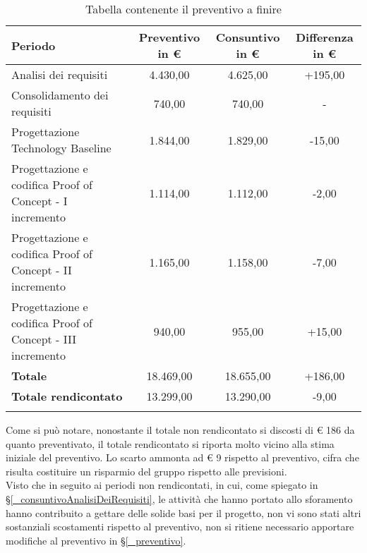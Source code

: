 \begin{longtable}{|p{6cm}|c|c|c|}
	\hline
	\rowcolor{lighter-grayer}
	\textbf{Periodo}             & \textbf{Preventivo in €} & \textbf{Consuntivo in €} & \textbf{Differenza in €} \\
	\hline
	\endfirsthead

	\hline
	Analisi dei requisiti            & 4.430,00        & 4.625,00  & +195,00   \\ 
	\hline
	\hline
	Consolidamento dei requisiti     & 740,00        & 740,00    & -  \\ 
	\hline
	\hline
	Progettazione Technology Baseline      & 1.844,00       & 1.829,00  & -15,00  \\
	\hline
	\hline
	Progettazione e codifica Proof of Concept - I incremento      & 1.114,00            & 1.112,00   & -2,00          \\
	\hline
	\hline
	Progettazione e codifica Proof of Concept - II incremento     & 1.165,00            & 1.158,00 & -7,00           \\
	\hline
	\hline
	Progettazione e codifica Proof of Concept - III incremento    & 940,00       & 955,00  & +15,00   \\
	\hline
	\textbf{Totale } & 18.469,00     & 18.655,00   &  +186,00       \\
	\hline
	\hline
	\textbf{Totale rendicontato} & 13.299,00       & 13.290,00     & -9,00     \\
	\hline
	\hline
	\rowcolor{white}
	\caption{Tabella contenente il preventivo a finire}
\end{longtable}

Come si può notare, nonostante il totale non rendicontato si discosti di € 186 da quanto preventivato, il totale rendicontato si riporta molto vicino alla stima iniziale del preventivo. Lo scarto ammonta ad € 9 rispetto al preventivo, cifra che risulta costituire un risparmio del gruppo rispetto alle previsioni. \\
Visto che in seguito ai periodi non rendicontati, in cui, come spiegato in \S\ref{_consuntivoAnalisiDeiRequisiti}, le attività che hanno portato allo sforamento hanno contribuito a gettare delle solide basi per il progetto, non vi sono stati altri sostanziali scostamenti rispetto al preventivo, non si ritiene necessario apportare modifiche al preventivo in \S\ref{_preventivo}.